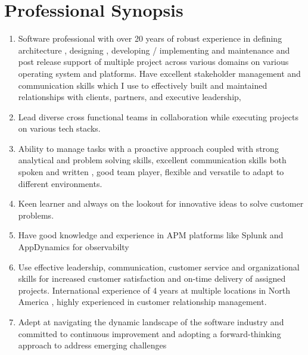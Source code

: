\documentclass[a4,10pt]{cv4tw}
\begin{document}
\vspace{-1.5cm}
\section{Professional Synopsis}
\begin{enumerate}
    \item Software professional with over 20 years of robust experience in defining architecture , designing , developing /  implementing and maintenance and post release support of multiple project across various domains on various operating system and platforms. Have excellent stakeholder management and communication skills which I use to effectively built and maintained relationships with clients, partners, and executive leadership,
    \item Lead diverse cross functional teams in collaboration while executing projects on various tech stacks.
    \item Ability to manage tasks with a proactive approach coupled with strong analytical and problem solving skills, excellent communication skills both spoken and written , good team player, flexible and versatile to adapt to different environments.
    \item Keen learner and always on the lookout for innovative ideas to solve customer problems.
    \item Have good knowledge and experience in APM platforms like Splunk and AppDynamics for observabilty
    \item Use effective leadership, communication, customer service and organizational skills for  increased customer satisfaction and on-time delivery of assigned projects. International experience of 4 years at multiple locations in North America , highly experienced in customer relationship management.
    \item Adept at navigating the dynamic landscape of the software industry and committed to continuous improvement and adopting a forward-thinking approach to address emerging challenges
\end{enumerate}
\end{document}
